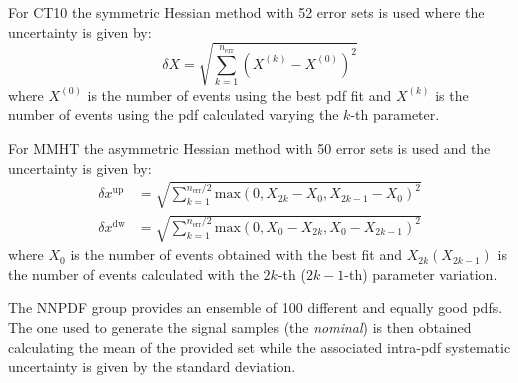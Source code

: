 For CT10 the symmetric Hessian method with 52 error sets is used where the
uncertainty is given by:
\begin{equation}
  \label{eq:119}
  \delta X = \sqrt{\sum_{k = 1}^{n_\mathrm{err}} \left(X^{(k)} -
      X^{(0)} \right)^2}
\end{equation}
where $X^{(0)}$ is the number of events using the best \gls{pdf} fit and
$X^{(k)}$ is the number of events using the \gls{pdf} calculated varying the
$k$-th parameter.

For MMHT the asymmetric Hessian method with 50 error sets is used and the
uncertainty is given by:
\begin{align}
  \label{eq:120}
  \delta x^{\mathrm{up}} & = \sqrt{\sum_{k = 1}^{n_\mathrm{err}/2}
                           \mathrm{max}(0, X_{2k} - X_0, X_{2k - 1} - X_0)^2} \\
  \delta x^{\mathrm{dw}} & = \sqrt{\sum_{k = 1}^{n_\mathrm{err}/2}
                           \mathrm{max}(0, X_0 - X_{2k}, X_0 - X_{2k - 1})^2}
\end{align}
where $X_0$ is the number of events obtained with the best fit and $X_{2k}
(X_{2k -1})$ is the number of events calculated with the $2k$-th ($2k -1$-th)
parameter variation.

The NNPDF group provides an ensemble of 100 different and equally good
\glspl{pdf}. The one used to generate the signal samples (the \emph{nominal}) is
then obtained calculating the mean of the provided set while the associated
intra-\gls{pdf} systematic uncertainty is given by the standard deviation.

